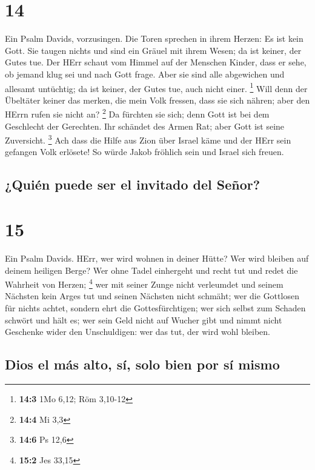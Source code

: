\hypertarget{section-13}{%
\section{14}\label{section-13}}

 Ein Psalm Davids, vorzusingen. Die Toren sprechen in
ihrem Herzen: Es ist kein Gott. Sie taugen nichts und sind ein Gräuel
mit ihrem Wesen; da ist keiner, der Gutes tue.  Der HErr
schaut vom Himmel auf der Menschen Kinder, dass er sehe, ob jemand klug
sei und nach Gott frage.  Aber sie sind alle abgewichen
und allesamt untüchtig; da ist keiner, der Gutes tue, auch nicht einer.
\footnote{\textbf{14:3} 1Mo 6,12; Röm 3,10-12}  Will denn
der Übeltäter keiner das merken, die mein Volk fressen, dass sie sich
nähren; aber den HErrn rufen sie nicht an? \footnote{\textbf{14:4} Mi
  3,3}  Da fürchten sie sich; denn Gott ist bei dem
Geschlecht der Gerechten.  Ihr schändet des Armen Rat;
aber Gott ist seine Zuversicht. \footnote{\textbf{14:6} Ps 12,6}
 Ach dass die Hilfe aus Zion über Israel käme und der HErr
sein gefangen Volk erlösete! So würde Jakob fröhlich sein und Israel
sich freuen.

\hypertarget{quiuxe9n-puede-ser-el-invitado-del-seuxf1or}{%
\subsection{¿Quién puede ser el invitado del
Señor?}\label{quiuxe9n-puede-ser-el-invitado-del-seuxf1or}}

\hypertarget{section-14}{%
\section{15}\label{section-14}}

 Ein Psalm Davids. HErr, wer wird wohnen in deiner Hütte?
Wer wird bleiben auf deinem heiligen Berge?  Wer ohne
Tadel einhergeht und recht tut und redet die Wahrheit von Herzen;
\footnote{\textbf{15:2} Jes 33,15}  wer mit seiner Zunge
nicht verleumdet und seinem Nächsten kein Arges tut und seinen Nächsten
nicht schmäht;  wer die Gottlosen für nichts achtet,
sondern ehrt die Gottesfürchtigen; wer sich selbst zum Schaden schwört
und hält es;  wer sein Geld nicht auf Wucher gibt und
nimmt nicht Geschenke wider den Unschuldigen: wer das tut, der wird wohl
bleiben.

\hypertarget{dios-el-muxe1s-alto-suxed-solo-bien-por-suxed-mismo}{%
\subsection{Dios el más alto, sí, solo bien por sí
mismo}\label{dios-el-muxe1s-alto-suxed-solo-bien-por-suxed-mismo}}

